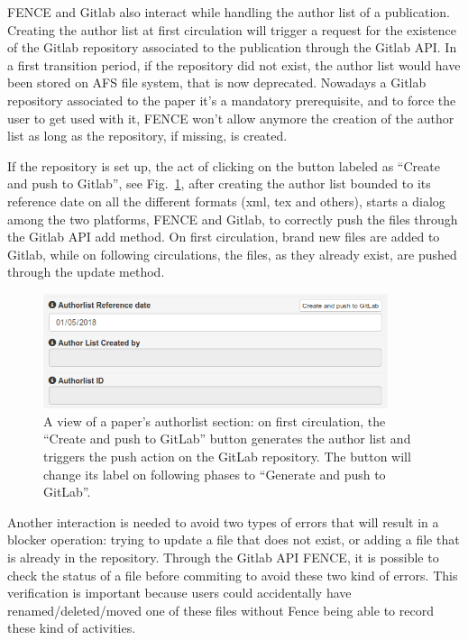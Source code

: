 FENCE and Gitlab also interact while handling the author list of a publication. Creating the author list at first circulation will trigger a request for the existence of the Gitlab repository associated to the publication through the Gitlab API. In a first transition period, if the repository did not exist, the author list would have been stored on AFS file system, that is now deprecated. Nowadays a Gitlab repository associated to the paper it’s a mandatory prerequisite, and to force the user to get used with it, FENCE won’t allow anymore the creation of the author list as long as the repository, if missing, is created.

If the repository is set up, the act of clicking on the button labeled as “Create and push to Gitlab”, see Fig.~\ref{fig:paper_authorlist_section}, after creating the author list bounded to its reference date on all the different formats (xml, tex and others), starts a dialog among the two platforms, FENCE and Gitlab, to correctly push the files through the Gitlab API add method. On first circulation, brand new files are added to Gitlab, while on following circulations, the files, as they already exist, are pushed through the update method.
\begin{figure}[ht!]
  \centering
  \includegraphics[width=0.9\textwidth]{figures/paper_authorlist_section.png}
  \caption{A view of a paper's authorlist section: on first circulation, the “Create and push to GitLab” button generates the author list and triggers the push action on the GitLab repository. The button will change its label on following phases to “Generate and push to GitLab”.}
  \label{fig:paper_authorlist_section}
\end{figure}

Another interaction is needed to avoid two types of errors that will result in a blocker operation: trying to update a file that does not exist, or adding a file that is already in the repository. Through the Gitlab API FENCE, it is possible to check the status of a file before commiting to avoid these two kind of errors. This verification is important because users could accidentally have renamed/deleted/moved one of these files without Fence being able to record these kind of activities.